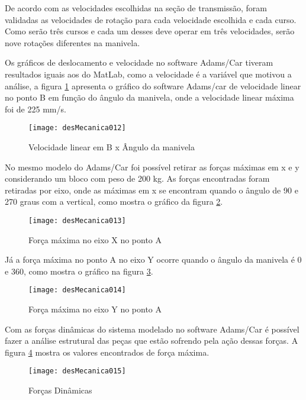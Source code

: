 		De acordo com as velocidades escolhidas na seção de transmissão, foram validadas as velocidades de rotação para cada velocidade escolhida e cada curso. Como serão três cursos e cada um desses deve operar em três velocidades, serão nove rotações diferentes na manivela. 
		
		Os gráficos de deslocamento e velocidade no software Adams/Car tiveram resultados iguais aos do MatLab, como a velocidade é a variável que motivou a análise, a figura \ref{desMecanica012} apresenta o gráfico do software Adams/car de velocidade linear no ponto B em função do ângulo da manivela, onde a velocidade linear máxima foi de 225 mm/s.

		\begin{figure}[!h]
			\centering
			\texttt{[image: desMecanica012]}
			\caption{Velocidade linear em B x Ângulo da manivela}
			\label{desMecanica012}
		\end{figure}

		No mesmo modelo do Adams/Car foi possível retirar as forças máximas em x e y considerando um bloco com peso de 200 kg. As forças encontradas foram retiradas por eixo, onde as máximas em x se encontram quando o ângulo de 90 e 270 graus com a vertical, como mostra o gráfico da figura \ref{desMecanica013}.

		
		\begin{figure}[!h]
			\centering
			\texttt{[image: desMecanica013]}
			\caption{Força máxima no eixo X no ponto A}
			\label{desMecanica013}
		\end{figure}

		Já a força máxima no ponto A no eixo Y ocorre quando o ângulo da manivela é 0 e 360, como mostra o gráfico na figura \ref{desMecanica014}.

		\begin{figure}[!h]
			\centering
			\texttt{[image: desMecanica014]}
			\caption{Força máxima no eixo Y no ponto A}
			\label{desMecanica014}
		\end{figure}

		Com as forças dinâmicas do sistema modelado no software Adams/Car é possível fazer a análise estrutural das peças que estão sofrendo pela ação dessas forças. A figura \ref{desMecanica015} mostra os valores encontrados de força máxima.

		\begin{figure}[!h]
			\centering
			\texttt{[image: desMecanica015]}
			\caption{Forças Dinâmicas}
			\label{desMecanica015}
		\end{figure}

